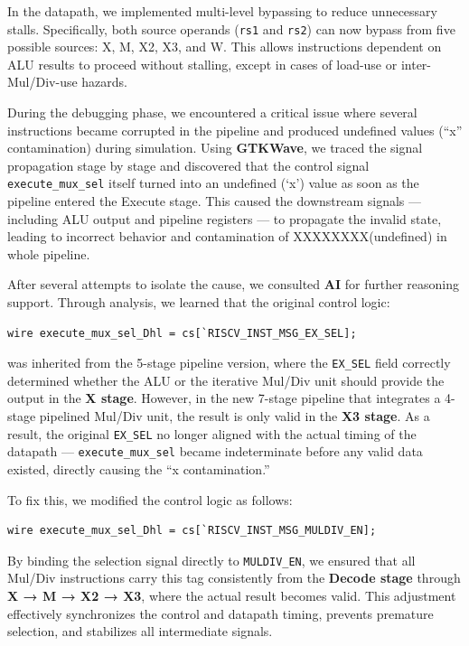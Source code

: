 \documentclass[11pt,a4paper]{article}
\begin{document}
In the datapath, we implemented multi-level bypassing to reduce unnecessary stalls. Specifically, both source operands (\texttt{rs1} and \texttt{rs2}) can now bypass from five possible sources: X, M, X2, X3, and W. This allows instructions dependent on ALU results to proceed without stalling, except in cases of load-use or inter-Mul/Div-use hazards.

During the debugging phase, we encountered a critical issue where several instructions became corrupted in the pipeline and produced undefined values (“x” contamination) during simulation. Using \textbf{GTKWave}, we traced the signal propagation stage by stage and discovered that the control signal \texttt{execute\_mux\_sel} itself turned into an undefined (‘x’) value as soon as the pipeline entered the Execute stage. This caused the downstream signals — including ALU output and pipeline registers — to propagate the invalid state, leading to incorrect behavior and contamination of XXXXXXXX(undefined) in whole pipeline.

After several attempts to isolate the cause, we consulted \textbf{AI} for further reasoning support. Through analysis, we learned that the original control logic:

\begin{verbatim}
wire execute_mux_sel_Dhl = cs[`RISCV_INST_MSG_EX_SEL];
\end{verbatim}

was inherited from the 5-stage pipeline version, where the \texttt{EX\_SEL} field correctly determined whether the ALU or the iterative Mul/Div unit should provide the output in the \textbf{X stage}. However, in the new 7-stage pipeline that integrates a 4-stage pipelined Mul/Div unit, the result is only valid in the \textbf{X3 stage}. As a result, the original \texttt{EX\_SEL} no longer aligned with the actual timing of the datapath — \texttt{execute\_mux\_sel} became indeterminate before any valid data existed, directly causing the “x contamination.”

To fix this, we modified the control logic as follows:

\begin{verbatim}
wire execute_mux_sel_Dhl = cs[`RISCV_INST_MSG_MULDIV_EN];
\end{verbatim}

By binding the selection signal directly to \texttt{MULDIV\_EN}, we ensured that all Mul/Div instructions carry this tag consistently from the \textbf{Decode stage} through \textbf{X → M → X2 → X3}, where the actual result becomes valid. This adjustment effectively synchronizes the control and datapath timing, prevents premature selection, and stabilizes all intermediate signals.
\end{document}
